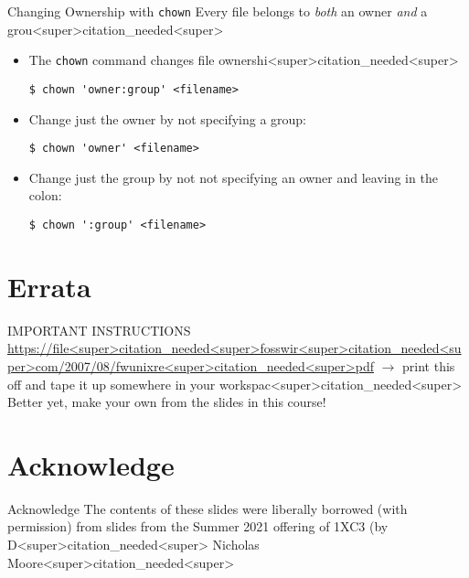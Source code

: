 \documentclass[11pt]{beamer}
\begin{document}
\begin{frame}[fragile=singleslide]{Changing Ownership with \texttt{chown}}
Every file belongs to \emph{both} an owner \emph{and} a grou<super>citation_needed<super>
\begin{itemize}
\item The \texttt{chown} command changes file ownershi<super>citation_needed<super>
\begin{lstlisting}[style=terminal]
$ chown 'owner:group' <filename>
\end{lstlisting}
\item Change just the owner by not specifying a group:
\begin{lstlisting}[style=terminal]
$ chown 'owner' <filename>
\end{lstlisting}
\item Change just the group by not not specifying an owner and leaving in the colon:
\begin{lstlisting}[style=terminal]
$ chown ':group' <filename>
\end{lstlisting}
\end{itemize}
\end{frame}

\section[Errata]{Errata}
\begin{frame}{IMPORTANT INSTRUCTIONS}
\url{https://file<super>citation_needed<super>fosswir<super>citation_needed<super>com/2007/08/fwunixre<super>citation_needed<super>pdf} $\rightarrow$ print this off and tape it up somewhere in your workspac<super>citation_needed<super> \\
Better yet, make your own from the slides in this course! 
\end{frame}


\section[Acknowledge]{Acknowledge}
\begin{frame}{Acknowledge}
\center
\vspace{8em}
The contents of these slides were liberally borrowed (with permission) from slides from the Summer 2021 offering of 1XC3 (by D<super>citation_needed<super> Nicholas Moore<super>citation_needed<super>  
\end{frame}
\end{document}
